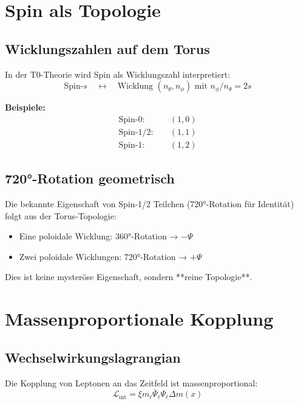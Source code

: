 	\section{Spin als Topologie}
	
	\subsection{Wicklungszahlen auf dem Torus}
	
	In der T0-Theorie wird Spin als Wicklungszahl interpretiert:
	\begin{equation}
		\text{Spin-}s \quad \longleftrightarrow \quad 
		\text{Wicklung } (n_\theta, n_\phi) \text{ mit } n_\phi/n_\theta = 2s
		\label{eq:spin_topology}
	\end{equation}
	
	\textbf{Beispiele:}
	\begin{align}
		\text{Spin-}0: &\quad (1, 0) \\
		\text{Spin-}1/2: &\quad (1, 1) \\
		\text{Spin-}1: &\quad (1, 2)
	\end{align}
	
	\subsection{720°-Rotation geometrisch}
	
	Die bekannte Eigenschaft von Spin-1/2 Teilchen (720°-Rotation für Identität) 
	folgt aus der Torus-Topologie:
	
	\begin{itemize}
		\item Eine poloidale Wicklung: 360°-Rotation → $-\Psi$
		\item Zwei poloidale Wicklungen: 720°-Rotation → $+\Psi$
	\end{itemize}
	
	Dies ist keine mysteröse Eigenschaft, sondern **reine Topologie**.
	
	\section{Massenproportionale Kopplung}
	
	\subsection{Wechselwirkungslagrangian}
	
	Die Kopplung von Leptonen an das Zeitfeld ist massenproportional:
	\begin{equation}
		\mathcal{L}_{\text{int}} = \xi m_\ell \bar{\Psi}_\ell \Psi_\ell \Delta m(x)
		\label{eq:mass_proportional}
	\end{equation}
	
